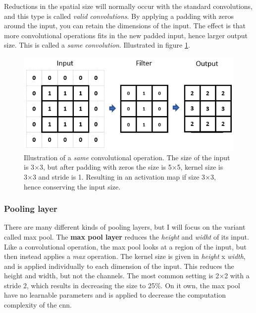     Reductions in the spatial size\cite{o2015introduction_convolutions} will normally occur with the standard convolutions, and this type is called \textit{valid convolutions}. By applying a padding with zeros around the input, you can retain the dimensions of the input. The effect is that more convolutional operations fits in the new padded input, hence larger output size. This is called a \textit{same convolution}. Illustrated in figure \ref{same_convolutional_fig}.
    
    \begin{figure}[H]
        \centering
        \includegraphics[scale=0.6]{figures/same_convolutions.png}
        \caption[Same convolution example]{Illustration of a \textit{same} convolutional operation. The size of the input is 3×3, but after padding with zeros the size is 5×5, kernel size is 3×3 and stride is 1. Resulting in an activation map if size 3×3, hence conserving the input size.}
      	\medskip 
        \label{same_convolutional_fig}
    \end{figure}
    
    
    
\subsubsection{Pooling layer}
    There are many different kinds of pooling layers, but I will focus on the variant called max pool. The \textbf{max pool layer} reduces the \textit{height} and \textit{widht} of its input\cite{o2015introduction_convolutions}. Like a convolutional operation, the max pool looks at a region of the input, but then instead applies a \textit{max} operation. The kernel size is given in \textit{height} x \textit{width}, and is applied individually to each dimension of the input. This reduces the height and width, but not the channels. The most common setting is 2×2 with a stride 2, which results in decreasing the size to 25\%. On it own, the max pool have no learnable parameters and is applied to decrease the computation complexity of the \gls{cnn}.

